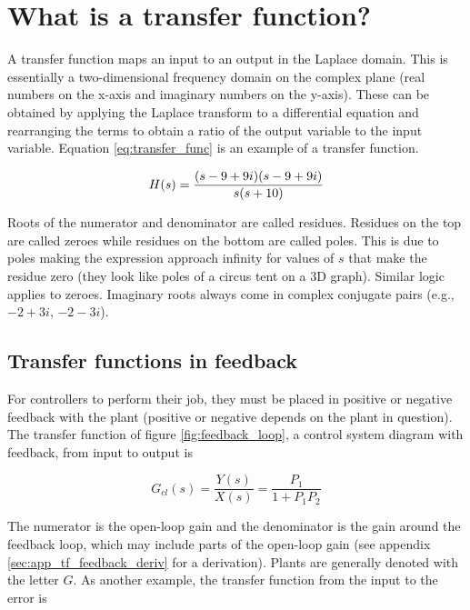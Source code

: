 \documentclass[10pt,conference,compsoc]{IEEEtran}
\begin{document}
\section{What is a transfer function?}

A transfer function maps an input to an output in the Laplace domain. This is
essentially a two-dimensional frequency domain on the complex plane (real
numbers on the x-axis and imaginary numbers on the y-axis). These can be
obtained by applying the Laplace transform to a differential equation and
rearranging the terms to obtain a ratio of the output variable to the input
variable. Equation \ref{eq:transfer_func} is an example of a transfer function.

\begin{equation} \label{eq:transfer_func}
  H(s) = \frac{(s-9+9i)(s-9+9i)}{s(s+10)} \\
\end{equation}

Roots of the numerator and denominator are called residues. Residues on the top
are called zeroes while residues on the bottom are called poles. This is due to
poles making the expression approach infinity for values of $s$ that make the
residue zero (they look like poles of a circus tent on a 3D graph). Similar
logic applies to zeroes. Imaginary roots always come in complex conjugate pairs
(e.g., $-2 + 3i$, $-2 - 3i$).

\subsection{Transfer functions in feedback}

For \glspl{controller} to perform their job, they must be placed in positive or
negative feedback with the \gls{plant} (positive or negative depends on the
\gls{plant} in question). The transfer function of figure
\ref{fig:feedback_loop}, a control system diagram with feedback, from input to
output is

\begin{equation}
  G_{cl}(s) = \frac{Y(s)}{X(s)} = \frac{P_1}{1 + P_1 P_2}
\end{equation}

The numerator is the \gls{open-loop gain} and the denominator is the gain around
the feedback loop, which may include parts of the \gls{open-loop gain} (see
appendix \ref{sec:app_tf_feedback_deriv} for a derivation). Plants are generally
denoted with the letter $G$. As another example, the transfer function from the
input to the error is
\end{document}
